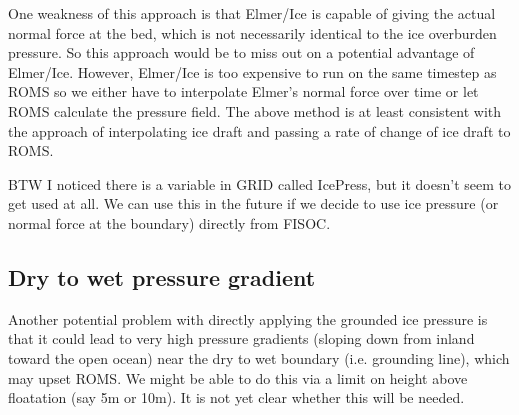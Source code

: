 \documentclass[12pt]{article}
\begin{document}
One weakness of this approach is that Elmer/Ice is capable of giving the actual normal force at the bed, which 
is not necessarily identical to the ice overburden pressure.  So this approach would be to miss out on 
a potential advantage of Elmer/Ice.  However, Elmer/Ice is too expensive to run on the same timestep as ROMS
so we either have to interpolate Elmer's normal force over time or let ROMS calculate the pressure field. 
The above method is at least consistent with the approach of interpolating ice draft and passing a rate of 
change of ice draft to ROMS.

BTW I noticed there is a variable in GRID called IcePress, but it doesn't seem to get used at all.
We can use this in the future if we decide to use ice pressure (or normal force at the 
boundary) directly from FISOC.





\subsection{Dry to wet pressure gradient}

Another potential problem with directly applying the grounded ice pressure is that it could lead to 
very high pressure gradients (sloping down from inland 
toward the open ocean) near the dry to wet boundary (i.e. grounding line), which may upset ROMS.  
We might be able to do this via a limit on height above floatation (say 5m or 10m). 
It is not yet clear whether this will be needed.  
\end{document}
